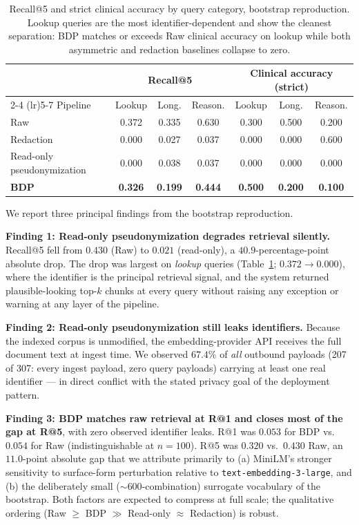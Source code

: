 \documentclass[11pt,a4paper]{article}
\begin{document}
\begin{table}[t]
\centering
\caption{Recall@5 and strict clinical accuracy by query category,
bootstrap reproduction. Lookup queries are the most identifier-dependent
and show the cleanest separation: BDP matches or exceeds Raw clinical
accuracy on lookup while both asymmetric and redaction baselines collapse
to zero.}
\label{tab:bycategory}
\small
\begin{tabular}{lcccccc}
\toprule
& \multicolumn{3}{c}{Recall@5} & \multicolumn{3}{c}{Clinical accuracy (strict)} \\
\cmidrule(lr){2-4} \cmidrule(lr){5-7}
Pipeline & Lookup & Long. & Reason. & Lookup & Long. & Reason. \\
\midrule
Raw                       & 0.372 & 0.335 & 0.630 & 0.300 & 0.500 & 0.200 \\
Redaction                 & 0.000 & 0.027 & 0.037 & 0.000 & 0.000 & 0.600 \\
Read-only pseudonymization & 0.000 & 0.038 & 0.037 & 0.000 & 0.000 & 0.000 \\
\textbf{BDP}              & \textbf{0.326} & \textbf{0.199} & \textbf{0.444} & \textbf{0.500} & \textbf{0.200} & \textbf{0.100} \\
\bottomrule
\end{tabular}
\end{table}

We report three principal findings from the bootstrap reproduction.

\textbf{Finding 1: Read-only pseudonymization degrades retrieval silently.}
Recall@5 fell from $0.430$ (Raw) to $0.021$ (read-only), a $40.9$-percentage-point
absolute drop. The drop was largest on \emph{lookup} queries
(Table~\ref{tab:bycategory}; $0.372 \to 0.000$), where the identifier is the
principal retrieval signal, and the system returned plausible-looking
top-$k$ chunks at every query without raising any exception or warning at
any layer of the pipeline.

\textbf{Finding 2: Read-only pseudonymization still leaks identifiers.}
Because the indexed corpus is unmodified, the embedding-provider API
receives the full document text at ingest time. We observed
$67.4\%$ of \emph{all} outbound payloads (207 of 307: every ingest payload,
zero query payloads) carrying at least one real identifier --- in direct
conflict with the stated privacy goal of the deployment pattern.

\textbf{Finding 3: BDP matches raw retrieval at R@1 and closes most of the
gap at R@5}, with zero observed identifier leaks. R@1 was $0.053$ for BDP
vs.\ $0.054$ for Raw (indistinguishable at $n{=}100$). R@5 was $0.320$
vs.\ $0.430$ Raw, an $11.0$-point absolute gap that we attribute primarily
to (a) MiniLM's stronger sensitivity to surface-form perturbation relative
to \texttt{text-embedding-3-large}, and (b) the deliberately small
($\sim 600$-combination) surrogate vocabulary of the bootstrap. Both
factors are expected to compress at full scale; the qualitative ordering
(Raw $\geq$ BDP $\gg$ Read-only $\approx$ Redaction) is robust.
\end{document}
